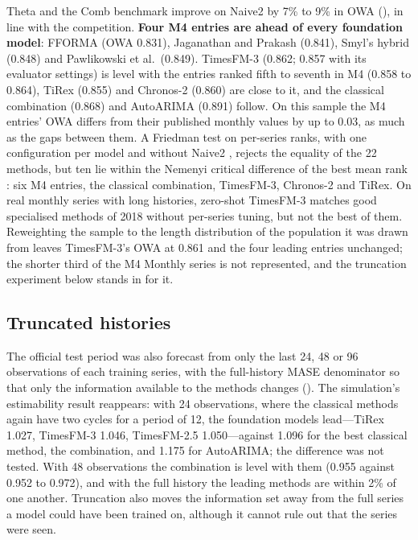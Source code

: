 

Theta and the Comb benchmark improve on Naive2 by 7\% to 9\% in OWA (), in line
with the competition. \textbf{Four M4 entries are ahead of every foundation model}: FFORMA (OWA 0.831),
Jaganathan and Prakash (0.841), Smyl's hybrid (0.848) and Pawlikowski et al.\ (0.849). TimesFM-3 (0.862;
0.857 with its evaluator settings) is level with the entries ranked fifth to seventh in M4 (0.858 to 0.864),
TiRex (0.855) and Chronos-2 (0.860) are close to it, and the classical combination (0.868) and AutoARIMA
(0.891) follow. On this sample the M4 entries' OWA differs from their published monthly values by up to
0.03, as much as the gaps between them. A Friedman test on per-series ranks, with one configuration per model
and without Naive2 \citep{benavoli2016should}, rejects the equality of the 22 methods, but ten lie within the
Nemenyi critical difference of the best mean rank \citep{demsar2006statistical}: six M4 entries, the
classical combination, TimesFM-3, Chronos-2 and TiRex. On real monthly series with long histories, zero-shot
TimesFM-3 matches good specialised methods of 2018 without per-series tuning, but not the best of them.
Reweighting the sample to the length distribution of the population it was drawn from leaves TimesFM-3's
OWA at 0.861 and the four leading entries unchanged; the shorter third of the M4 Monthly series is not
represented, and the truncation experiment below stands in for it.

\subsection{Truncated histories}
\label{sec:truncation}

The official test period was also forecast from only the last 24, 48 or 96 observations of each training
series, with the full-history MASE denominator so that only the information available to the methods
changes (). The simulation's estimability result reappears: with 24 observations,
where the classical methods again have two cycles for a period of 12, the foundation models lead---TiRex
1.027, TimesFM-3 1.046, TimesFM-2.5 1.050---against 1.096 for the best classical method, the combination,
and 1.175 for AutoARIMA; the difference was not tested. With 48 observations the combination is level with
them (0.955 against 0.952 to 0.972), and with the full history the leading methods are within 2\% of one
another. Truncation also moves the information set away from the full series a model could have been trained
on, although it cannot rule out that the series were seen.


